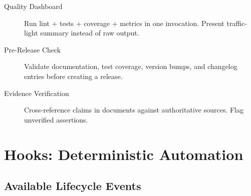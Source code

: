 
\begin{description}
  \item[Quality Dashboard] Run lint + tests + coverage + metrics in one invocation.
    Present traffic-light summary instead of raw output.
  \item[Pre-Release Check] Validate documentation, test coverage, version bumps,
    and changelog entries before creating a release.
  \item[Evidence Verification] Cross-reference claims in documents against
    authoritative sources. Flag unverified assertions.
\end{description}


\section{Hooks: Deterministic Automation}
\label{sec:hooks}



\subsection{Available Lifecycle Events}

